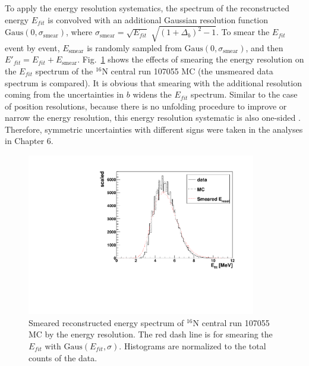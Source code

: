To apply the energy resolution systematics, the spectrum of the reconstructed energy $E_{fit}$ is convolved with an additional Gaussian resolution function $\mathrm{Gaus}(0,\sigma_\mathrm{smear})$, where $\sigma_\mathrm{smear}=\sqrt{E_{fit}} \; \sqrt{(1+\Delta_{b})^2-1}$. To smear the $E_{fit}$ event by event, $E_\mathrm{smear}$ is randomly sampled from $\mathrm{Gaus}(0,\sigma_\mathrm{smear})$, and then $E'_{fit}=E_{fit}+E_\mathrm{smear}$. Fig.~\ref{fig:EresolSmear} shows the effects of smearing the energy resolution on the $E_{fit}$ spectrum of the $^{16}$N central run 107055 MC (the unsmeared data spectrum is compared). It is obvious that smearing with the additional resolution coming from the uncertainties in $b$ widens the $E_{fit}$ spectrum. Similar to the case of position resolutions, because there is no unfolding procedure to improve or narrow the energy resolution, this energy resolution systematic is also one-sided \cite{marzec2019measurement}. Therefore, symmetric uncertainties with different signs were taken in the analyses in Chapter 6.
\begin{figure}
	\centering
	\includegraphics[width=10cm]{SmearedEresol_N16_new.pdf}
	\caption[Smeared reconstructed energy spectrum of $^{16}$N central run 107055 MC by the energy resolution.]{Smeared reconstructed energy spectrum of $^{16}$N central run 107055 MC by the energy resolution. The red dash line is for smearing the $E_{fit}$ with $\mathrm{Gaus}(E_{fit},\sigma)$. Histograms are normalized to the total counts of the data.\label{fig:EresolSmear}}
\end{figure}
